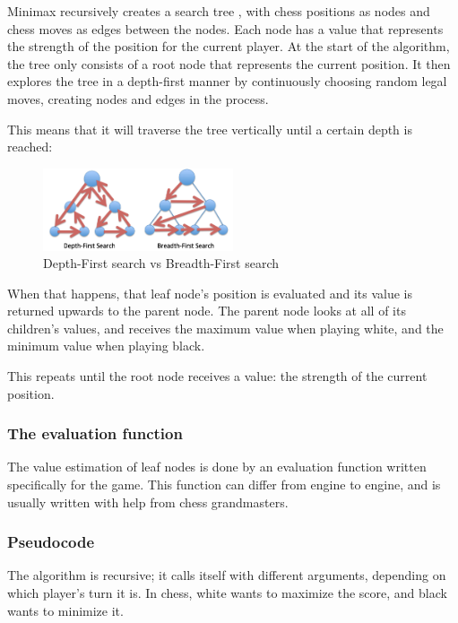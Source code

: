 \documentclass{article}
\begin{document}
Minimax recursively creates a search tree \cite{eppesHowComputerizedChess2019}, with chess positions as nodes and chess moves as edges between the nodes. 
Each node has a value that represents the strength of the position for the current player. 
At the start of the algorithm, the tree only consists of a root node that represents the current position. 
It then explores the tree in a depth-first manner by continuously choosing random legal moves, creating nodes and edges in the process.

This means that it will traverse the tree vertically until a certain depth is reached:

\begin{figure}[H]
    \centering
    \includegraphics[width=0.5\textwidth]{img/depth-vs-breadth.png}
    \caption{Depth-First search vs Breadth-First search \cite{eppesHowComputerizedChess2019}}
\end{figure}

When that happens, that leaf node's position is evaluated and its value is returned
upwards to the parent node. The parent node looks at all of its children's values, 
and receives the maximum value when playing white, and the minimum value
when playing black. 

This repeats until the root node receives a value: the strength of the current position.

\subsubsection{The evaluation function}

The value estimation of leaf nodes is done by an evaluation function \cite{EvaluationFunction2022} written specifically
for the game. This function can differ from engine to engine, and is usually written with 
help from chess grandmasters. 



\subsubsection{Pseudocode}

The algorithm is recursive; it calls itself with different arguments, depending
on which player's turn it is. In chess, white wants to maximize the score, and 
black wants to minimize it. \cite{Minimax2022}
\end{document}
